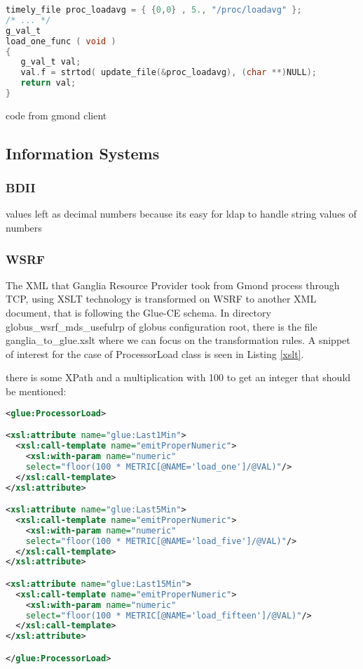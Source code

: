 \begin{lstlisting}[language=C,caption=libmetrics code to get load average]
timely_file proc_loadavg = { {0,0} , 5., "/proc/loadavg" };
/* ... */
g_val_t
load_one_func ( void )
{
   g_val_t val;
   val.f = strtod( update_file(&proc_loadavg), (char **)NULL);
   return val;
}
\end{lstlisting}
code from gmond client

\subsection{Information Systems}

\subsubsection{BDII}

values left as decimal numbers because its easy for ldap to handle string values of numbers

\subsubsection{WSRF}

The XML that Ganglia Resource Provider took from Gmond process through TCP, using XSLT technology is transformed on WSRF to another XML document, that is following the Glue-CE schema. In directory globus\_wsrf\_mds\_usefulrp of globus configuration root, there is the file ganglia\_to\_glue.xslt where we can focus on the transformation rules. A snippet of interest for the case of ProcessorLoad class is seen in Listing \ref{xslt}.

there is some XPath and a multiplication with 100 to get an integer that should be mentioned:

\begin{lstlisting}[language=XML,caption=WSRF XSLT for Ganglia Information Provider,label=xslt]
<glue:ProcessorLoad>

<xsl:attribute name="glue:Last1Min">
  <xsl:call-template name="emitProperNumeric">
    <xsl:with-param name="numeric" 
    select="floor(100 * METRIC[@NAME='load_one']/@VAL)"/>
  </xsl:call-template>
</xsl:attribute>

<xsl:attribute name="glue:Last5Min">
  <xsl:call-template name="emitProperNumeric">
    <xsl:with-param name="numeric" 
    select="floor(100 * METRIC[@NAME='load_five']/@VAL)"/>
  </xsl:call-template>
</xsl:attribute>

<xsl:attribute name="glue:Last15Min">
  <xsl:call-template name="emitProperNumeric">
    <xsl:with-param name="numeric" 
    select="floor(100 * METRIC[@NAME='load_fifteen']/@VAL)"/>
  </xsl:call-template>
</xsl:attribute>

</glue:ProcessorLoad>
\end{lstlisting}

